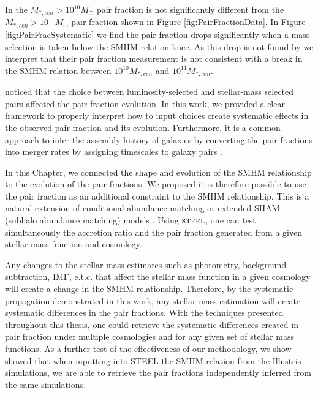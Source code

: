 In \citet{Mundy2017A3.5} the $M_{*,cen} > 10^{10} M_{\odot}$ pair fraction is not significantly different from the $M_{*,cen} > 10^{11} M_{\odot}$ pair fraction shown in Figure \ref{fig:PairFractionData}. In Figure \ref{fig:PairFracSystematic} we find the pair fraction drops significantly when a mass selection is taken below the SMHM relation knee. As this drop is not found by \citet{Mundy2017A3.5} we interpret that their pair fraction measurement is not consistent with a break in the SMHM relation between $10^{10} M_{*,cen}$ and $10^{11} M_{*,cen}$.

\citet{Man2016RESOLVING03} noticed that the choice between luminosity-selected and stellar-mass selected pairs affected the pair fraction evolution. In this work, we provided a clear framework to properly interpret how to input choices create systematic effects in the observed pair fraction and its evolution. Furthermore, it is a common approach to infer the assembly history of galaxies by converting the pair fractions into merger rates by assigning timescales to galaxy pairs \citep{Conselice20033,Conselice2008TheField,Mundy2017A3.5}. 

In this Chapter, we connected the shape and evolution of the SMHM relationship to the evolution of the pair fractions.
We proposed it is therefore possible to use the pair fraction as an additional constraint to the SMHM relationship. This is a natural extension of conditional abundance matching or extended SHAM (subhalo abundance matching) models \citep{Hearin2013SHAMGroups}.
Using $\textsc{steel}$, one can test simultaneously the accretion ratio and the pair fraction generated from a given stellar mass function and cosmology.

Any changes to the stellar mass estimates such as photometry, background subtraction, IMF, e.t.c. that affect the stellar mass function in a given cosmology will create a change in the SMHM relationship. Therefore, by the systematic propagation demonstrated in this work, any stellar mass estimation will create systematic differences in the pair fractions. 
With the techniques presented throughout this thesis, one could retrieve the systematic differences created in pair fraction under multiple \LCDM cosmologies and for any given set of stellar mass functions. As a further test of the effectiveness of our methodology, we show showed that when inputting into STEEL the SMHM relation from the Illustris simulations, we are able to retrieve the pair fractions independently inferred from the same simulations.

